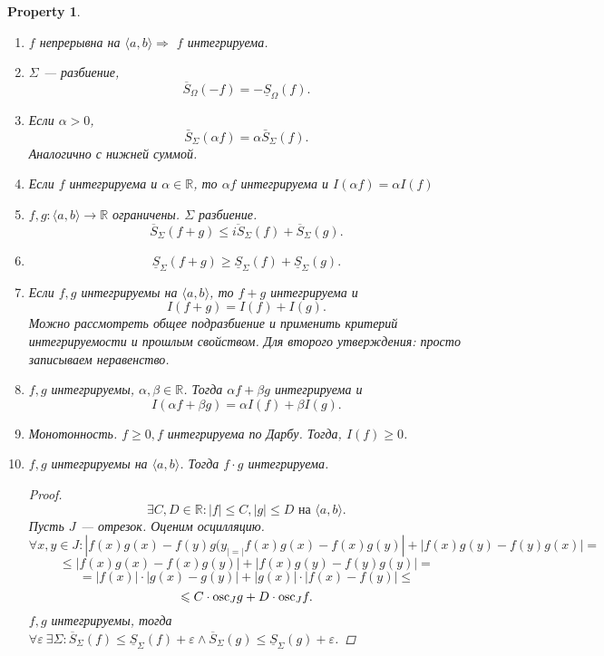 \documentclass[11pt]{book}
\newcommand{\R}{\mathbb{R}}
\newcommand{\osc}{{\mathop{\text{\rm osc}}}}
\renewcommand{\le}{\leqslant}
\renewcommand{\ge}{\geqslant}
\theoremstyle{definition}
\theoremstyle{plain}
\theoremstyle{plain}
\newtheorem*{prop}{Property}
\theoremstyle{definition}
\theoremstyle{remark}
\begin{document}
\begin{prop}
    \begin{enumerate}
	\item $ f$   непрерывна на $ \langle a, b \rangle \Rightarrow $ $ f$   интегрируема.
	\item  $ \Sigma  $ --- разбиение, \[
		\overline{S}_{ \Omega } (-f) =  -\underline{S}_{ \Omega } (f)
	    .\]
	\item Если $ \alpha >0$, \[
		\bar{S}_{ \Sigma }(\alpha f) = \alpha \bar{S}_{ \Sigma}(f)
	    .\]
	    Аналогично с нижней суммой.
	\item Если $ f$   интегрируема и $ \alpha  \in  \R$, то $ \alpha  f$   интегрируема и $ I( \alpha  f) = \alpha I(f)$
	\item $ f, g : \langle a, b \rangle \to  \R$   ограничены. $ \Sigma $   разбиение.
	    \[
		\overline{S}_{ \Sigma }(f+g) \le  \overline{iS}_{ \Sigma }(f) + \overline{S}_{ \Sigma } (g)
	    .\]
	\item
	    \[
		\underline{S}_{ \Sigma } (f + g)  \ge  \underline{S}_{ \Sigma } (f) + \underline{S}_{ \Sigma }(g)
	    .\]
	\item  Если $ f , g$   интегрируемы на $ \langle a, b \rangle$, то $ f + g $   интегрируема и \[
		I(f+g) = I(f) + I(g)
	    .\]
	    Можно рассмотреть общее подразбиение и применить критерий интегрируемости и прошлым свойством. Для второго утверждения: просто записываем неравенство.
	\item $ f, g$   интегрируемы, $ \alpha , \beta \in  \R$.
	    Тогда $ \alpha f + \beta  g$  интегрируема и
	    \[
		I( \alpha f+ \beta g) = \alpha I(f) + \beta  I(g)
	    .\]
	\item Монотонность.
	    $ f \ge 0, f$   интегрируема по Дарбу. Тогда, $ I(f) \ge  0$.
	\item $ f, g$   интегрируемы на $ \langle a, b \rangle$. Тогда $ f \cdot g$   интегрируема.
	    \begin{proof}
		\[
		    \exists  C, D \in  \R: |f| \le  C, |g| \le D \text{ на } \langle a, b \rangle
		.\]
		Пусть $ J$ --- отрезок. Оценим осцилляцию.
		\[
		    \forall  x, y \in  J: | f(x) g(x) - f(y) g(y_| = |f(x) g(x) - f(x) g(y)  | + | f(x) g(y) - f(y) g(x)|=
		\]
		\[
		    \le  |f(x) g(x) - f(x) g(y)| + |f(x) g(y) - f(y) g(y)| =
		\]
		\[
		    =  |f(x)| \cdot |g(x) - g(y)| + |g(x) | \cdot |f(x) - f(y)| \le
		\]
		\[
		    \le  C \cdot \osc_J g + D \cdot \osc_J f
		.\]
		$ f, g$   интегрируемы, тогда $ \forall  \varepsilon  ~ \exists  \Sigma  : \overline{S}_{ \Sigma } (f) \le  \underline{S} _{ \Sigma } (f) + \varepsilon  \wedge \overline{S}_{ \Sigma}(g) \le \underline{S}_{ \Sigma }(g)  + \varepsilon $.


\end{proof}
\end{enumerate}
\end{prop}
\end{document}
